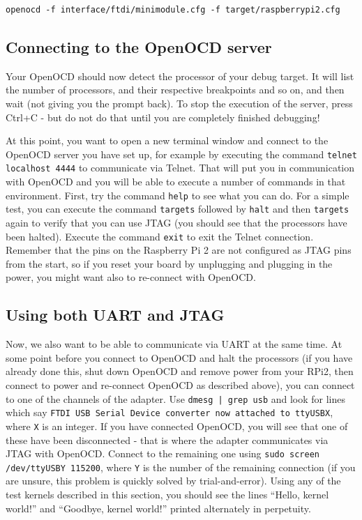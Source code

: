 \documentclass[a4paper,11pt,reqno]{amsart}
\begin{document}
{\begin{verbatim}
openocd -f interface/ftdi/minimodule.cfg -f target/raspberrypi2.cfg
\end{verbatim}

\subsection{Connecting to the OpenOCD server}
Your OpenOCD should now detect the processor of your debug target. It will list the number of processors, and their respective breakpoints and so on, and then wait (not giving you the prompt back). To stop the execution of the server, press Ctrl+C - but do not do that until you are completely finished debugging!

At this point, you want to open a new terminal window and connect to the OpenOCD server you have set up, for example by executing the command \texttt{telnet localhost 4444} to communicate via Telnet. That will put you in communication with OpenOCD and you will be able to execute a number of commands in that environment. First, try the command \texttt{help} to see what you can do. For a simple test, you can execute the command \texttt{targets} followed by \texttt{halt} and then \texttt{targets} again to verify that you can use JTAG (you should see that the processors have been halted). Execute the command \texttt{exit} to exit the Telnet connection. Remember that the pins on the Raspberry Pi 2 are not configured as JTAG pins from the start, so if you reset your board by unplugging and plugging in the power, you might want also to re-connect with OpenOCD.

\subsection{Using both UART and JTAG}
Now, we also want to be able to communicate via UART at the same time. At some point before you connect to OpenOCD and halt the processors (if you have already done this, shut down OpenOCD and remove power from your RPi2, then connect to power and re-connect OpenOCD as described above), you can connect to one of the channels of the adapter. Use \texttt{dmesg | grep usb} and look for lines which say \texttt{FTDI USB Serial Device converter now attached to ttyUSBX}, where \texttt{X} is an integer. If you have connected OpenOCD, you will see that one of these have been disconnected - that is where the adapter communicates via JTAG with OpenOCD. Connect to the remaining one using \texttt{sudo screen /dev/ttyUSBY 115200}, where \texttt{Y} is the number of the remaining connection (if you are unsure, this problem is quickly solved by trial-and-error). Using any of the test kernels described in this section, you should see the lines ``Hello, kernel world!'' and ``Goodbye, kernel world!'' printed alternately in perpetuity.

}
\end{document}
